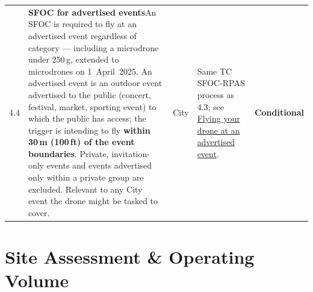 \documentclass[11pt,letterpaper]{article}
\newcommand{\reqcell}[2]{\textbf{#1}\newline\small\color{uavgrey}#2}
\newcommand{\cond}{\textbf{\color{uavblue}Conditional}}
\begin{document}
\begin{longtable}{@{}L{0.28in} L{2.20in} L{0.85in} L{1.95in} L{0.85in}@{}}
4.4 &
\reqcell{SFOC for advertised events}{An SFOC is required to fly at an advertised event regardless of category --- including a microdrone under 250\,g, extended to microdrones on 1~April~2025. An advertised event is an outdoor event advertised to the public (concert, festival, market, sporting event) to which the public has access; the trigger is intending to fly \textbf{within 30\,m (100\,ft) of the event boundaries}. Private, invitation-only events and events advertised only within a private group are excluded. Relevant to any City event the drone might be tasked to cover.} &
City &
Same TC SFOC-RPAS process as 4.3; see
\href{https://tc.canada.ca/en/aviation/drone-safety/drone-pilot-licensing/get-permission-special-drone-operations/flying-your-drone-advertised-event}{Flying your drone at an advertised event}. &
\cond{} \\

\end{longtable}

\newpage

\section{Site Assessment \& Operating Volume}
\end{document}
